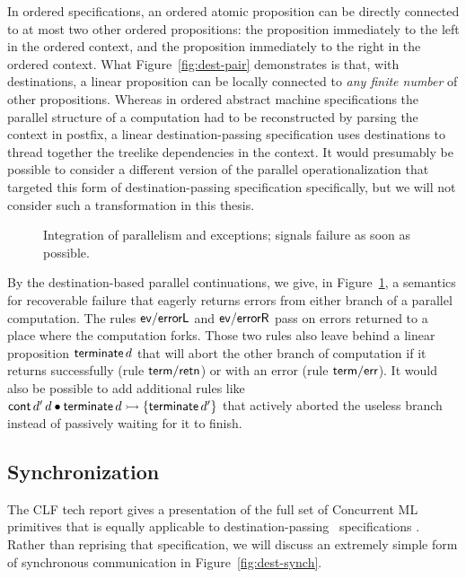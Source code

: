 In ordered specifications, an ordered atomic proposition can be
directly connected to at most two other ordered propositions: the
proposition immediately to the left in the ordered context, and the
proposition immediately to the right in the ordered context. What
Figure~\ref{fig:dest-pair} demonstrates is that, with destinations, a
linear proposition can be locally connected to {\it any finite number}
of other propositions. Whereas in ordered abstract machine
specifications the parallel structure of a computation had to be
reconstructed by parsing the context in postfix, a linear
destination-passing specification uses destinations to thread together
the treelike dependencies in the context. It would presumably be
possible to consider a different version of the parallel
operationalization that targeted this form of destination-passing
specification specifically, but we will not consider such a
transformation in this thesis. 

\begin{figure}
\caption{Integration of parallelism and exceptions; signals failure as
  soon as possible.}
\label{fig:dest-fail-paror}
\end{figure}

By the destination-based parallel continuations, we give, in
Figure~\ref{fig:dest-fail-paror}, a semantics for recoverable failure
that eagerly returns errors from either branch of a parallel
computation. The rules ${\sf ev/errorL}$ and ${\sf ev/errorR}$ pass on
errors returned to a place where the computation forks.  Those two
rules also leave behind a linear proposition ${\sf terminate}\,d$ that
will abort the other branch of computation if it returns successfully
(rule ${\sf term/retn}$) or with an error (rule ${\sf term/err}$). It
would also be possible to add additional rules like ${\sf cont}\,d'\,d
\mathbin{\bullet} {\sf terminate}\,d \rightarrowtail \{ {\sf terminate}\,d' \}$ that
actively aborted the useless branch instead of passively waiting for
it to finish.

\subsection{Synchronization}
\label{sec:dest-synch}

The CLF tech report gives a presentation of the full set of Concurrent
ML primitives that is equally applicable to destination-passing
\sls~specifications \cite{cervesato02concurrent}. Rather than
reprising that specification, we will discuss an extremely simple form
of synchronous communication in Figure~\ref{fig:dest-synch}. 

